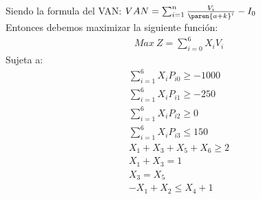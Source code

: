 

\begin{homeworkProblem}
Siendo la formula del VAN: $VAN = \sum_{i=1}^{n}{\frac{V_i}{\paren{a+k}^i}} - I_0$\\
Entonces debemos maximizar la siguiente función:
\begin{align*}
    Max\ Z = \sum_{i=0}^{6}{X_iV_i}
\end{align*}
Sujeta a:
\begin{align*}
    \sum_{i=1}^{6}{X_iP_{i0}}\geq -1000 \\
    \sum_{i=1}^{6}{X_iP_{i1}}\geq -250 \\
    \sum_{i=1}^{6}{X_iP_{i2}}\geq 0 \\
    \sum_{i=1}^{6}{X_iP_{i3}}\leq 150 \\
    X_1 + X_3 + X_5 + X_6 \geq 2 \\
    X_1 + X_3 = 1\\
    X_3 = X_5 \\
    -X_1 + X_2 \leq X_4 + 1
\end{align*}
\end{homeworkProblem}


